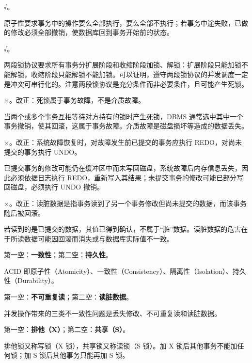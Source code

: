 \documentclass[a4paper,11pt]{article}
\begin{document}

\q √。\begin{analysis}原子性要求事务中的操作要么全部执行，要么全部不执行；若事务中途失败，已做的修改必须全部撤销，使数据库回到事务开始前的状态。\end{analysis}

\q √。\begin{analysis}两段锁协议要求所有事务分扩展阶段和收缩阶段加锁、解锁：扩展阶段只能加锁不能解锁，收缩阶段只能解锁不能加锁。可以证明，遵守两段锁协议的并发调度一定是冲突可串行化的。注意两段锁协议是充分条件而非必要条件，且可能产生死锁。\end{analysis}

\q ×。改正：死锁属于事务故障，不是介质故障。\begin{analysis}当两个或多个事务互相等待对方持有的锁时产生死锁，DBMS 通常选中其中一个事务撤销，使其回滚，这属于事务故障。介质故障是磁盘损坏等造成的数据丢失。\end{analysis}

\q ×。改正：系统故障恢复时，对故障发生前已提交的事务应执行 REDO，对尚未提交的事务执行 UNDO。\begin{analysis}已提交事务的修改可能仍在缓冲区中而未写回磁盘，系统故障后内存信息丢失，因此必须依据日志执行 REDO，重新写入其结果；未提交事务的修改可能已部分写回磁盘，必须执行 UNDO 撤销。\end{analysis}

\q ×。改正：读脏数据是指事务读到了另一个事务修改但尚未提交的数据，而该事务随后被回滚。\begin{analysis}若读到的是已提交的数据，其值已得到确认，不属于“脏”数据。读脏数据的危害在于所读数据可能因回滚而消失或与数据库实际值不一致。\end{analysis}


\q 第一空：\textbf{一致性}；第二空：\textbf{持久性}。\begin{analysis}ACID 即原子性（Atomicity）、一致性（Consistency）、隔离性（Isolation）、持久性（Durability）。\end{analysis}

\q 第一空：\textbf{不可重复读}；第二空：\textbf{读脏数据}。\begin{analysis}并发操作带来的三类不一致性问题是丢失修改、不可重复读和读脏数据。\end{analysis}

\q 第一空：\textbf{排他（X）}；第二空：\textbf{共享（S）}。\begin{analysis}排他锁又称写锁（X 锁），共享锁又称读锁（S 锁）。加 X 锁后其他事务不能加任何锁；加 S 锁后其他事务只能再加 S 锁。\end{analysis}
\end{document}

